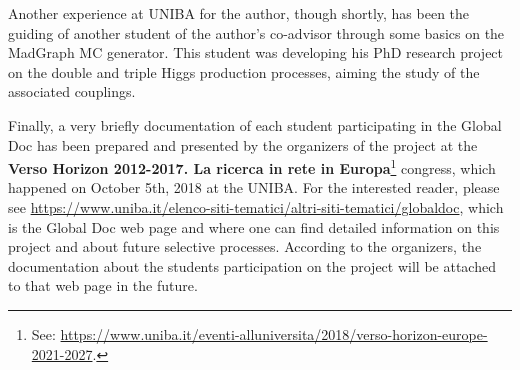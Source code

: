 Another experience at UNIBA for the author, though shortly, has been the guiding of another student of the author's co-advisor through some basics on the MadGraph MC generator. This student was developing his PhD research project on the double and triple Higgs production processes, aiming the study of the associated couplings.

Finally, a very briefly documentation of each student participating in the Global Doc has been prepared and presented by the organizers of the project at the \textbf{Verso Horizon 2012-2017. La ricerca in rete in Europa}\footnote{See:  \url{https://www.uniba.it/eventi-alluniversita/2018/verso-horizon-europe-2021-2027}.} congress, which happened on October 5th, 2018 at the UNIBA. For the interested reader, please see \url{https://www.uniba.it/elenco-siti-tematici/altri-siti-tematici/globaldoc}, which is the Global Doc web page and where one can find detailed information on this project and about future selective processes. According to the organizers, the documentation about the students participation on the project will be attached to that web page in the future.